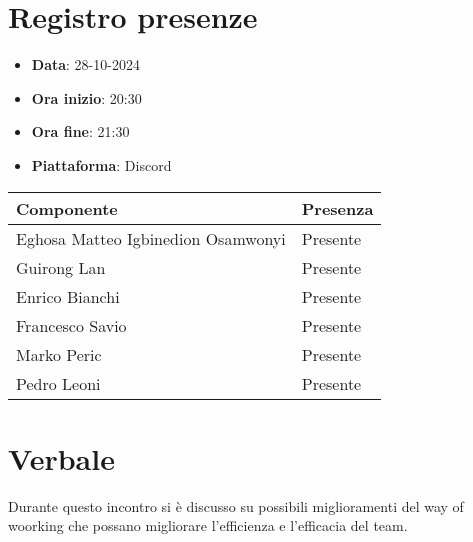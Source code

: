 \documentclass[a4paper, 12pt]{article}
\begin{document}
\section{Registro presenze}
\begin{itemize}
    \item[] \textbf{Data}: 28-10-2024
    \item[] \textbf{Ora inizio}:  20:30
    \item[] \textbf{Ora fine}: 21:30
    \item[] \textbf{Piattaforma}: Discord
\end{itemize}
\begin{table}[!h]
\centering
{\renewcommand{\arraystretch}{2}
\begin{tabularx}{\textwidth}{| X | X |}
    \hline
        \textbf{\large Componente} & 
        \textbf{\large Presenza} \\ 
    \hline 
    \hline
        Eghosa Matteo Igbinedion Osamwonyi&
        Presente \\
    \hline 
        Guirong Lan&
        Presente \\
    \hline 
        Enrico Bianchi&
        Presente \\
    \hline 
        Francesco Savio&
        Presente \\
    \hline 
        Marko Peric&
        Presente \\
    \hline 
        Pedro Leoni&
        Presente \\
    \hline  

\end{tabularx}}
\end{table}

\newpage

\section{Verbale}
Durante questo incontro si è discusso su possibili miglioramenti del way of woorking che possano migliorare l’efficienza e l’efficacia del team.
\end{document}
